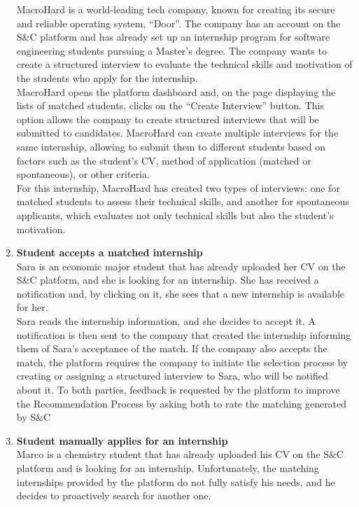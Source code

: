 \begin{enumerate}
        MacroHard is a world-leading tech company, known for creating its secure and reliable operating system, “Door”. The company has an account on the S\&C platform and has already set up an internship program for software engineering students pursuing a Master’s degree. The company wants to create a structured interview to evaluate the technical skills and motivation of the students who apply for the internship.\\
        MacroHard opens the platform dashboard and, on the page displaying the lists of matched students, clicks on the “Create Interview” button. This option allows the company to create structured interviews that will be submitted to candidates. 
        MacroHard can create multiple interviews for the same internship, allowing to submit them to different students based on factors such as the student’s CV, method of application (matched or spontaneous), or other criteria. \\
        For this internship, MacroHard has created two types of interviews: one for matched students to assess their technical skills, and another for spontaneous applicants, which evaluates not only technical skills but also the student's motivation.
    \item \textbf{\textcolor{titleColor}{Student accepts a matched internship}}\\
        Sara is an economic major student that has already uploaded her CV on the S\&C platform, and she is looking for an internship. She has received a notification and, by clicking on it, she sees that a new internship is available for her.\\
        Sara reads the internship information, and she decides to accept it. A notification is then sent to the company that created the internship informing them of Sara's acceptance of the match. If the company also accepts the match, the platform requires the company to initiate the selection process by creating or assigning a structured interview to Sara, who will be notified about it.
        To both parties, feedback is requested by the platform to improve the Recommendation Process by asking both to rate the matching generated by S\&C  
    \item \textbf{\textcolor{titleColor}{Student manually applies for an internship}}\\
        Marco is a chemistry student that has already uploaded his CV on the S\&C platform and is looking for an internship. Unfortunately, the matching internships provided by the platform do not fully satisfy his needs, and he decides to proactively search for another one.\\

\end{enumerate}
